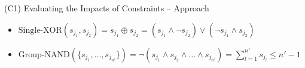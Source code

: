 \documentclass[en, navbarinline, handout]{sdqbeamer}
\begin{document}
\begin{frame}[t]{(C1) Evaluating the Impacts of Constraints -- Approach}
\begin{itemize}
\begin{itemize}
		\end{itemize}
	\end{itemize}
	\pause
	\vspace{0.5\baselineskip}
	\begin{examples}
		\begin{itemize}
			\item $\text{Single-XOR}(s_{j_1}, s_{j_2}) = s_{j_1} \oplus s_{j_2} = (s_{j_1} \land \lnot s_{j_2}) \lor (\lnot s_{j_1} \land s_{j_2})$
			\item $\text{Group-NAND}(\{s_{j_1}, \dots, s_{j_{n'}}\}) =	\lnot (s_{j_1} \land s_{j_2} \land \dots \land s_{j_{n'}}) = \sum_{l=1}^{n'} s_{j_l} \leq n'-1$
		\end{itemize}
	\end{examples}
\end{frame}
\end{document}
